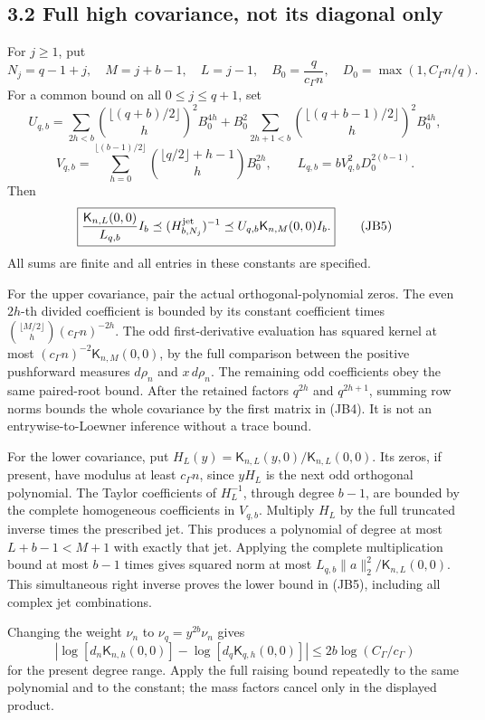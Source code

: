 \documentclass[10pt]{article}
\begin{document}
\subsection{3.2 Full high covariance, not its diagonal only}\label{full-high-covariance-not-its-diagonal-only}

For \(j\ge1\), put \[
 N_j=q-1+j,\quad M=j+b-1,\quad L=j-1,
 \quad B_0=\frac q{c_\Gamma n},\quad D_0=\max(1,C_\Gamma n/q).
\] For a common bound on all \(0\le j\le q+1\), set \[
 U_{q,b}=
 \sum_{2h<b}\binom{\lfloor(q+b)/2\rfloor}{h}^{\!2}B_0^{4h}
 +B_0^2\sum_{2h+1<b}
 \binom{\lfloor(q+b-1)/2\rfloor}{h}^{\!2}B_0^{4h},
\] \[
 V_{q,b}=\sum_{h=0}^{\lfloor(b-1)/2\rfloor}
 \binom{\lfloor q/2\rfloor+h-1}{h}B_0^{2h},
 \qquad L_{q,b}=bV_{q,b}^2D_0^{2(b-1)}.
 \tag{JB4}
\] Then \[
 \boxed{\frac{\mathsf K_{n,L}(0,0)}{L_{q,b}}I_b
 \preceq(H^{\rm jet}_{b,N_j})^{-1}
 \preceq U_{q,b}\mathsf K_{n,M}(0,0)I_b.}
 \tag{JB5}
\] All sums are finite and all entries in these constants are specified.

For the upper covariance, pair the actual orthogonal-polynomial zeros. The even \(2h\)-th divided coefficient is bounded by its constant coefficient times \(\binom{\lfloor M/2\rfloor}{h}(c_\Gamma n)^{-2h}\). The odd first-derivative evaluation has squared kernel at most \((c_\Gamma n)^{-2}\mathsf K_{n,M}(0,0)\), by the full comparison between the positive pushforward measures \(d\rho_n\) and \(x\,d\rho_n\). The remaining odd coefficients obey the same paired-root bound. After the retained factors \(q^{2h}\) and \(q^{2h+1}\), summing row norms bounds the whole covariance by the first matrix in (JB4). It is not an entrywise-to-Loewner inference without a trace bound.

For the lower covariance, put \(H_L(y)=\mathsf K_{n,L}(y,0)/\mathsf K_{n,L}(0,0)\). Its zeros, if present, have modulus at least \(c_\Gamma n\), since \(yH_L\) is the next odd orthogonal polynomial. The Taylor coefficients of \(H_L^{-1}\), through degree \(b-1\), are bounded by the complete homogeneous coefficients in \(V_{q,b}\). Multiply \(H_L\) by the full truncated inverse times the prescribed jet. This produces a polynomial of degree at most \(L+b-1<M+1\) with exactly that jet. Applying the complete multiplication bound at most \(b-1\) times gives squared norm at most \(L_{q,b}\|a\|_2^2/\mathsf K_{n,L}(0,0)\). This simultaneous right inverse proves the lower bound in (JB5), including all complex jet combinations.

Changing the weight \(\nu_n\) to \(\nu_q=y^{2b}\nu_n\) gives \[
 \left|\log[d_n\mathsf K_{n,h}(0,0)]
       -\log[d_q\mathsf K_{q,h}(0,0)]\right|
 \le2b\log(C_\Gamma/c_\Gamma)
 \tag{JB6}
\] for the present degree range. Apply the full raising bound repeatedly to the same polynomial and to the constant; the mass factors cancel only in the displayed product.
\end{document}
